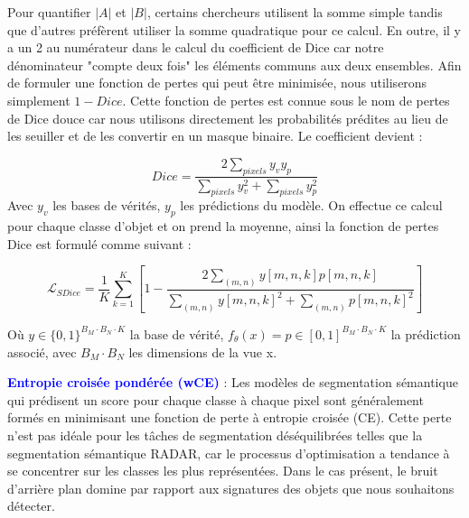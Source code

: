 Pour quantifier $\vert A \vert$ et $\vert B \vert$, certains chercheurs utilisent la somme simple tandis que d'autres préfèrent utiliser la somme quadratique pour ce calcul. En outre, il y a un 2 au numérateur dans le calcul du coefficient de Dice car notre dénominateur "compte deux fois" les éléments communs aux deux ensembles. Afin de formuler une fonction de pertes qui peut être minimisée, nous utiliserons simplement $1-Dice$. Cette fonction de pertes est connue sous le nom de pertes de Dice douce car nous utilisons directement les probabilités prédites au lieu de les seuiller et de les convertir en un masque binaire. Le coefficient devient : 

\begin{equation}
  Dice = \frac{2\sum_{pixels}y_{v}y_{p}}{\sum_{pixels}y_{v}^2 + \sum_{pixels}y_{p}^2}
\end{equation}
Avec $y_v$ les bases de vérités, $y_p$ les prédictions du modèle. On effectue ce calcul pour chaque classe d'objet et on prend la moyenne, ainsi la fonction de pertes Dice est formulé comme suivant : 

\begin{equation}
\mathcal{L}_{SDice} = \frac{1}{K} \sum_{k=1}^{K} \left[ 1 - \frac{2\sum_{(m,n)}y[m,n,k]p[m,n,k]}{\sum_{(m,n)}y[m,n,k]^2+\sum_{(m,n)}p[m,n,k]^2}\right]
\end{equation}\label{eqn:44}

Où $y\in \{0,1\}^{B_M\cdot B_N \cdot K}$ la base de vérité, $f_\theta (x) = p \in [0,1]^{B_M\cdot B_N \cdot K}$ la prédiction associé, avec $B_M\cdot B_N $ les dimensions de la vue x. 

\textcolor{blue}{\textbf{Entropie croisée pondérée (wCE)}} : Les modèles de segmentation sémantique qui prédisent un score pour chaque classe à chaque pixel sont généralement formés en minimisant une fonction de perte à entropie croisée (CE). Cette perte n'est pas idéale pour les tâches de segmentation déséquilibrées telles que la segmentation sémantique RADAR, car le processus d'optimisation a tendance à se concentrer sur les classes les plus représentées. Dans le cas présent, le bruit d'arrière plan domine par rapport aux signatures des objets que nous souhaitons détecter. 

